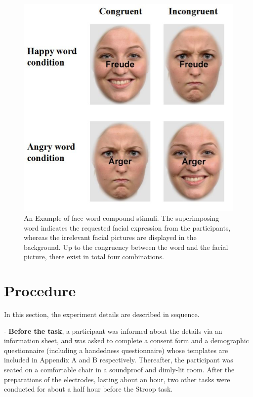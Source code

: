 \begin{figure}[!t]
  \includegraphics[width=0.9\linewidth]{pictures/Stimulus.png}
  \caption{An Example of face-word compound stimuli. The superimposing word indicates the requested facial expression from the participants, whereas the irrelevant facial pictures are displayed in the background. Up to the congruency between the word and the facial picture, there exist in total four combinations.
}
  \label{fig.method.setup.example}
\end{figure}


\section{Procedure}\label{sec.method.details}
In this section, 
the experiment details are 
described in sequence.


\noindent - \textbf{Before the task}, 
a participant was informed about the details via an information sheet, and was 
asked to complete a consent form and a demographic questionnaire (including a handedness questionnaire) whose templates are included in Appendix A and B respectively. Thereafter, the participant was seated on a comfortable chair in a soundproof and dimly-lit room. After the preparations of the electrodes, lasting about an hour, two other tasks were conducted for about a half hour before the Stroop task.

